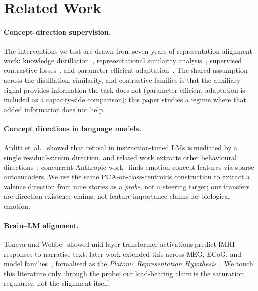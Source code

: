\section{Related Work}
\label{sec:related}

\paragraph{Concept-direction supervision.}
The interventions we test are drawn from seven years of
representation-alignment work: knowledge
distillation~\citep{hinton2015distilling,tian2020crd,park2019rkd},
representational similarity
analysis~\citep{kriegeskorte2008rsa,sundaram2024perceptual}, supervised
contrastive losses~\citep{khosla2020supcon,vandenoord2018cpc,radford2021clip},
and parameter-efficient adaptation~\citep{hu2022lora,liu2022ia3}. The
shared assumption across the distillation, similarity, and contrastive
families is that the auxiliary signal provides information the task does
not (parameter-efficient adaptation is included as a capacity-side
comparison); this paper studies a regime where that added information
does not help.

\paragraph{Concept directions in language models.}
Arditi et~al.~\citep{arditi2024refusal} showed that refusal in
instruction-tuned LMs is mediated by a single residual-stream
direction, and related work extracts other behavioural
directions~\citep{li2023inferencetime,zou2023repe,kim2018tcav};
concurrent Anthropic work~\citep{sofroniew2026anthropic} finds
emotion-concept features via sparse autoencoders. We use the same
PCA-on-class-centroids construction to extract a valence direction
from nine stories as a \emph{probe}, not a steering target; our
transfers are direction-existence claims, not feature-importance
claims for biological emotion.

\paragraph{Brain--LM alignment.}
Toneva and Wehbe~\citep{toneva2019interpreting} showed mid-layer
transformer activations predict fMRI responses to narrative text;
later work extended this across MEG, ECoG, and model
families~\citep{schrimpf2021neural,goldstein2022shared,caucheteux2022brains},
formalised as the \emph{Platonic Representation
Hypothesis}~\citep{huh2024platonic}. We touch this literature only
through the probe; our load-bearing claim is the saturation
regularity, not the alignment itself.


